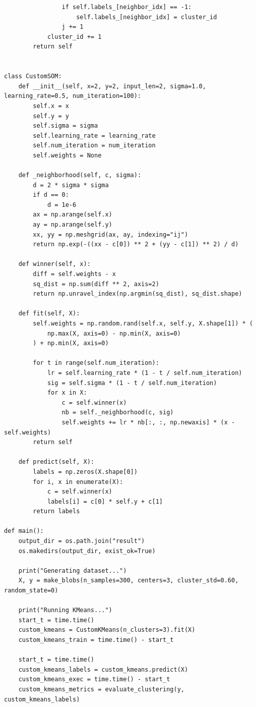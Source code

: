 \documentclass[runningheads]{ctexart}
\begin{document}
\begin{lstlisting}
                if self.labels_[neighbor_idx] == -1:
                    self.labels_[neighbor_idx] = cluster_id
                j += 1
            cluster_id += 1
        return self


class CustomSOM:
    def __init__(self, x=2, y=2, input_len=2, sigma=1.0, learning_rate=0.5, num_iteration=100):
        self.x = x
        self.y = y
        self.sigma = sigma
        self.learning_rate = learning_rate
        self.num_iteration = num_iteration
        self.weights = None

    def _neighborhood(self, c, sigma):
        d = 2 * sigma * sigma
        if d == 0:
            d = 1e-6
        ax = np.arange(self.x)
        ay = np.arange(self.y)
        xx, yy = np.meshgrid(ax, ay, indexing="ij")
        return np.exp(-((xx - c[0]) ** 2 + (yy - c[1]) ** 2) / d)

    def winner(self, x):
        diff = self.weights - x
        sq_dist = np.sum(diff ** 2, axis=2)
        return np.unravel_index(np.argmin(sq_dist), sq_dist.shape)

    def fit(self, X):
        self.weights = np.random.rand(self.x, self.y, X.shape[1]) * (
            np.max(X, axis=0) - np.min(X, axis=0)
        ) + np.min(X, axis=0)

        for t in range(self.num_iteration):
            lr = self.learning_rate * (1 - t / self.num_iteration)
            sig = self.sigma * (1 - t / self.num_iteration)
            for x in X:
                c = self.winner(x)
                nb = self._neighborhood(c, sig)
                self.weights += lr * nb[:, :, np.newaxis] * (x - self.weights)
        return self

    def predict(self, X):
        labels = np.zeros(X.shape[0])
        for i, x in enumerate(X):
            c = self.winner(x)
            labels[i] = c[0] * self.y + c[1]
        return labels

def main():
    output_dir = os.path.join("result")
    os.makedirs(output_dir, exist_ok=True)

    print("Generating dataset...")
    X, y = make_blobs(n_samples=300, centers=3, cluster_std=0.60, random_state=0)

    print("Running KMeans...")
    start_t = time.time()
    custom_kmeans = CustomKMeans(n_clusters=3).fit(X)
    custom_kmeans_train = time.time() - start_t

    start_t = time.time()
    custom_kmeans_labels = custom_kmeans.predict(X)
    custom_kmeans_exec = time.time() - start_t
    custom_kmeans_metrics = evaluate_clustering(y, custom_kmeans_labels)


\end{lstlisting}
\end{document}
